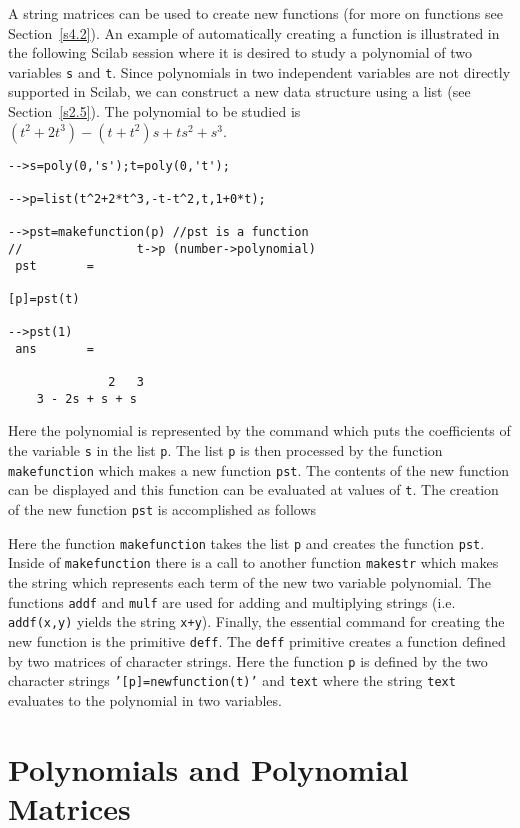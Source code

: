 	A string matrices can be used to create new 
functions (for more on functions
see Section~\ref{s4.2}).  An example of automatically creating a 
function is illustrated in the following Scilab session where it is
desired to study a polynomial of two variables {\tt s} and {\tt t}.
Since polynomials in two independent variables are not directly 
supported in Scilab, we can construct a new data structure using
a list (see Section~\ref{s2.5}).
The polynomial to be studied is $(t^2+2t^3)-(t+t^2)s+ts^2+s^3$.
\begin{verbatim}
-->s=poly(0,'s');t=poly(0,'t');
 
-->p=list(t^2+2*t^3,-t-t^2,t,1+0*t);
 
-->pst=makefunction(p) //pst is a function 
//                t->p (number->polynomial)
 pst       =
 
[p]=pst(t)
 
-->pst(1)
 ans       =
 
              2   3  
    3 - 2s + s + s   
\end{verbatim}
Here the polynomial is represented by the command which puts
the coefficients of the variable {\tt s} in the list {\tt p}.
The list {\tt p} is then processed by the function {\tt makefunction}
which makes a new function {\tt pst}.  The contents of the new function
can be displayed and this function can be evaluated
at values of {\tt t}.  The creation of the new function {\tt pst}
is accomplished as follows



Here the function {\tt makefunction} takes the list {\tt p} and creates the
function {\tt pst}.  Inside of {\tt makefunction} there is a call to another 
function {\tt makestr} which makes the string which represents each 
term of the new two variable polynomial.  The functions {\tt addf} and
{\tt mulf} are used for adding and multiplying strings (i.e. 
{\tt addf(x,y)} yields the string {\tt x+y}).  Finally, the 
essential command for creating the new function 
is the primitive {\tt deff}.  The {\tt deff} primitive 
creates a function defined by two matrices
of character strings.  Here the 
function {\tt p} is defined by the two character strings
{\tt '[p]=newfunction(t)'} and {\tt text} where the string {\tt text}
evaluates to the polynomial in two variables.

\section{Polynomials and Polynomial Matrices}
\label{s2.4}

